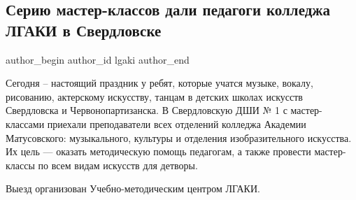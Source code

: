  
 
 
 
 
 
\subsection{Серию мастер-классов дали педагоги колледжа ЛГАКИ в Свердловске}
\label{sec:02_02_2022.stz.edu.lnr.lgaki.1.masterklass_sverdlovsk}
 
\ifcmt
 author_begin
   author_id lgaki
 author_end
\fi

Сегодня – настоящий праздник у ребят, которые учатся музыке, вокалу, рисованию,
актерскому искусству, танцам в детских школах искусств Свердловска и
Червонопартизанска. В Свердловскую ДШИ № 1 с мастер-классами приехали
преподаватели всех отделений колледжа Академии Матусовского: музыкального,
культуры и отделения изобразительного искусства. Их цель — оказать методическую
помощь педагогам, а также провести мастер-классы по всем видам искусств для
детворы.


Выезд организован Учебно-методическим центром ЛГАКИ.

